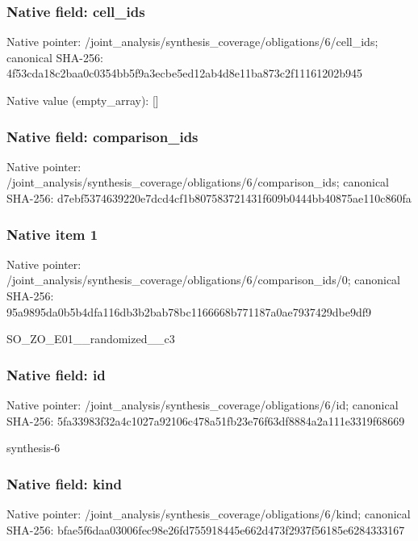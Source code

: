 \documentclass[10pt,a4paper]{article}
\begin{document}
\subsubsection{Native field: cell\_\allowbreak{}ids}
Native pointer: /joint\_\allowbreak{}analysis/synthesis\_\allowbreak{}coverage/obligations/6/cell\_\allowbreak{}ids; canonical SHA-256: 4f53cda18c2baa0c0354bb5f9a3ecbe5ed12ab4d8e11ba873c2f11161202b945

Native value (empty\_\allowbreak{}array): []

\subsubsection{Native field: comparison\_\allowbreak{}ids}
Native pointer: /joint\_\allowbreak{}analysis/synthesis\_\allowbreak{}coverage/obligations/6/comparison\_\allowbreak{}ids; canonical SHA-256: d7ebf5374639220e7dcd4cf1b807583721431f609b0444bb40875ae110c860fa

\subsubsection{Native item 1}
Native pointer: /joint\_\allowbreak{}analysis/synthesis\_\allowbreak{}coverage/obligations/6/comparison\_\allowbreak{}ids/0; canonical SHA-256: 95a9895da0b5b4dfa116db3b2bab78bc1166668b771187a0ae7937429dbe9df9

\begingroup\raggedright\sloppy SO\_\allowbreak{}ZO\_\allowbreak{}E01\_\allowbreak{}\_\allowbreak{}randomized\_\allowbreak{}\_\allowbreak{}c3\par\endgroup

\subsubsection{Native field: id}
Native pointer: /joint\_\allowbreak{}analysis/synthesis\_\allowbreak{}coverage/obligations/6/id; canonical SHA-256: 5fa33983f32a4c1027a92106c478a51fb23e76f63df8884a2a111e3319f68669

\begingroup\raggedright\sloppy synthesis-6\par\endgroup

\subsubsection{Native field: kind}
Native pointer: /joint\_\allowbreak{}analysis/synthesis\_\allowbreak{}coverage/obligations/6/kind; canonical SHA-256: bfae5f6daa03006fec98e26fd755918445e662d473f2937f56185e6284333167
\end{document}
